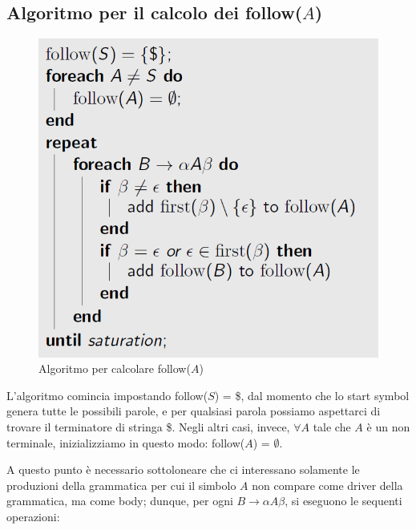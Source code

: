\documentclass[class=book, crop=false, oneside, 12pt]{standalone}
\begin{document}
\subsection{Algoritmo per il calcolo dei follow(\(A\))}

\begin{figure}[H]
    \centering
    \includegraphics[width=.7\textwidth,keepaspectratio]{follow-algorithm.png}
    \caption{Algoritmo per calcolare follow(\(A\))}
    \label{follow-algorithm}
\end{figure}

L'algoritmo comincia impostando follow(\(S\)) = \$, dal momento che lo start symbol genera tutte le possibili parole, e per qualsiasi parola possiamo aspettarci di trovare il terminatore di stringa \$. Negli altri casi, invece, \(\forall A\) tale che \(A\) è un non terminale, inizializziamo in questo modo: follow(\(A\)) = \(\emptyset\).

A questo punto è necessario sottoloneare che ci interessano solamente le produzioni della grammatica per cui il simbolo \(A\) non compare come driver della grammatica, ma come body; dunque, per ogni \(B \rightarrow \alpha A \beta\), si eseguono le sequenti operazioni: 
\end{document}
